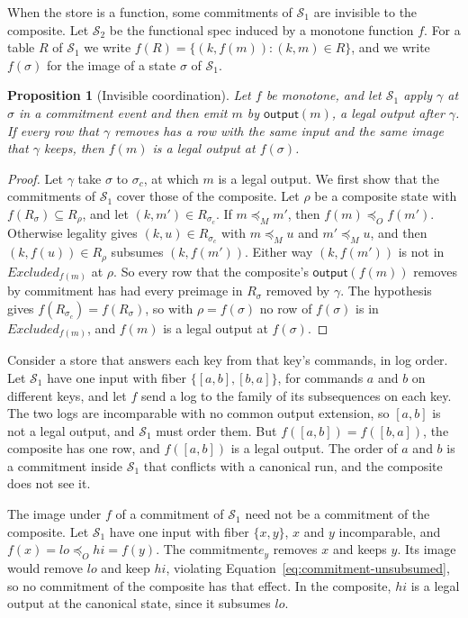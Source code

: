 \documentclass[sigconf]{cidr-2027}
\newtheorem{proposition}{Proposition}
\theoremstyle{remark}
\newcommand{\OutputOrd}{\preceq_O}
\newcommand{\commitment}{commitment\xspace}
\newcommand{\commitments}{commitments\xspace}
\newcommand{\outnoun}{output extension\xspace}%
\newcommand{\Spec}{\mathcal{S}}
\newcommand{\Excluded}{\mathit{Excluded}}
\begin{document}
When the store is a function, some \commitments of $\Spec_1$ are invisible to
the composite. Let $\Spec_2$ be the functional spec induced by a monotone
function $f$. For a table $R$ of $\Spec_1$ we write
$f(R)=\{(k,f(m)):(k,m)\in R\}$, and we write $f(\sigma)$ for the image of a
state $\sigma$ of $\Spec_1$.

\begin{proposition}[Invisible coordination]
\label{prop:invisible-coordination}
Let $f$ be monotone, and let $\Spec_1$ apply $\gamma$ at $\sigma$ in a
\commitment event and then emit $m$ by $\mathsf{output}(m)$, a legal output
after $\gamma$. If every row that $\gamma$ removes has a row with the same
input and the same image that $\gamma$ keeps, then $f(m)$ is a legal output at
$f(\sigma)$.
\end{proposition}

\begin{proof}
Let $\gamma$ take $\sigma$ to $\sigma_c$, at which $m$ is a legal output. We
first show that the \commitments of $\Spec_1$ cover those of the composite. Let $\rho$ be a composite state with $f(R_\sigma)\subseteq R_\rho$, and let
$(k,m')\in R_{\sigma_c}$. If $m\preceq_M m'$, then $f(m)\OutputOrd f(m')$. Otherwise legality gives $(k,u)\in R_{\sigma_c}$ with $m\preceq_M u$ and
$m'\preceq_M u$, and then $(k,f(u))\in R_\rho$ subsumes $(k,f(m'))$. Either
way $(k,f(m'))$ is not in $\Excluded_{f(m)}$ at $\rho$. So every row that the
composite's $\mathsf{output}(f(m))$ removes by \commitment has had every
preimage in $R_\sigma$ removed by $\gamma$. The hypothesis gives
$f(R_{\sigma_c})=f(R_\sigma)$, so with $\rho=f(\sigma)$ no row of $f(\sigma)$
is in $\Excluded_{f(m)}$, and $f(m)$ is a legal output at $f(\sigma)$.
\end{proof}

Consider a store that answers each key from that key's commands, in log
order. Let $\Spec_1$ have one input with fiber $\{[a,b],[b,a]\}$, for
commands $a$ and $b$ on different keys, and let $f$ send a log to the family
of its subsequences on each key. The two logs are incomparable with no common
\outnoun, so $[a,b]$ is not a legal output, and $\Spec_1$ must order them. But $f([a,b])=f([b,a])$, the composite has one row, and $f([a,b])$ is a legal
output. The order of $a$ and $b$ is a \commitment inside $\Spec_1$ that
conflicts with a canonical run, and the composite does not see it.

The image under $f$ of a \commitment of $\Spec_1$ need not be a \commitment
of the composite. Let $\Spec_1$ have one input with fiber $\{x,y\}$, $x$ and
$y$ incomparable, and $f(x)=\mathit{lo}\OutputOrd\mathit{hi}=f(y)$. The
\commitment $e_y$ removes $x$ and keeps $y$. Its image would remove
$\mathit{lo}$ and keep $\mathit{hi}$, violating
Equation~\ref{eq:commitment-unsubsumed}, so no \commitment of the composite
has that effect. In the composite, $\mathit{hi}$ is a legal output at the
canonical state, since it subsumes $\mathit{lo}$.
\end{document}
